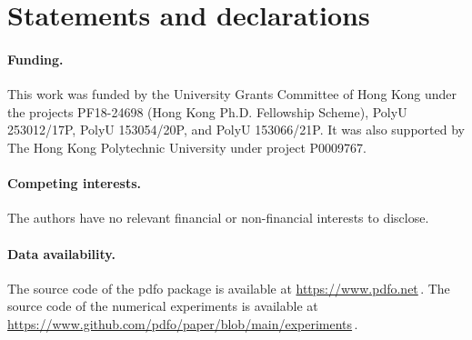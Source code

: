 \documentclass[
    smallextended,  %
    final,          %
]{svjour3}
\begin{document}
\section*{Statements and declarations}

\paragraph{\textnormal{\textbf{Funding.}}}

This work was funded by the University Grants Committee of Hong Kong under the
projects PF18-24698 (Hong Kong Ph.D. Fellowship Scheme), PolyU 253012/17P, PolyU 153054/20P,
and PolyU 153066/21P.
It was also supported by The Hong Kong Polytechnic University under project P0009767.

\paragraph{\textnormal{\textbf{Competing interests.}}}

The authors have no relevant financial or non-financial interests to disclose.

\paragraph{\textnormal{\textbf{Data availability.}}}

The source code of the \gls{pdfo} package is available at \mbox{\url{https://www.pdfo.net}}\,.
The source code of the numerical experiments is available at
\mbox{\url{https://www.github.com/pdfo/paper/blob/main/experiments}}\,.



\end{document}
